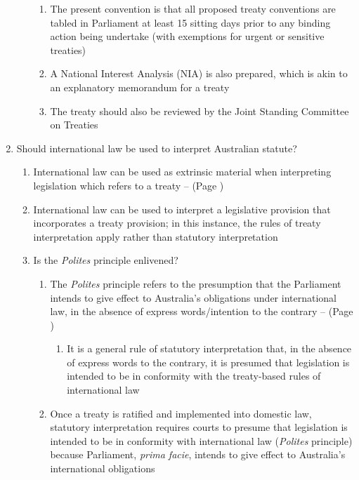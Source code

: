 \begin{enumerate}
\begin{enumerate}
\begin{enumerate}
            \item The present convention is that all proposed treaty conventions are tabled in Parliament at least 15 sitting days prior to any binding action being undertake (with exemptions for urgent or sensitive treaties)
            \item A National Interest Analysis (NIA) is also prepared, which is akin to an explanatory memorandum for a treaty
            \item The treaty should also be reviewed by the Joint Standing Committee on Treaties
        \end{enumerate}
    \end{enumerate}
    \item Should international law be used to interpret Australian statute?
    \begin{enumerate}
        \item International law can be used as extrinsic material when interpreting legislation which refers to a treaty --  (Page \pageref{Acts Interpretation Act s 15AB})
        \item International law can be used to interpret a legislative provision that incorporates a treaty provision; in this instance, the rules of treaty interpretation apply rather than statutory interpretation
        \item Is the \textit{Polites} principle enlivened?
        \begin{enumerate}
            \item The \textit{Polites} principle refers to the presumption that the Parliament intends to give effect to Australia's obligations under international law, in the absence of express words/intention to the contrary --  (Page \pageref{case:Polites v Commonwealth})
            \begin{enumerate}
                \item It is a general rule of statutory interpretation that, in the absence of express words to the contrary, it is presumed that legislation is intended to be in conformity with the treaty-based rules of international law
            \end{enumerate}
            \item Once a treaty is ratified and implemented into domestic law, statutory interpretation requires courts to presume that legislation is intended to be in conformity with international law (\textit{Polites} principle) because Parliament, \textit{prima facie}, intends to give effect to Australia's international obligations

\end{enumerate}
\end{enumerate}
\end{enumerate}
